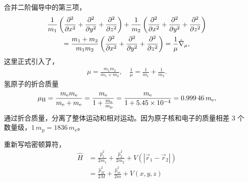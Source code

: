 合并二阶偏导中的第三项，
\begin{multline}
    \frac1{m_1} \left(\pdv[2]x + \pdv[2]y + \pdv[2]z\right) +
    \frac1{m_2} \left(\pdv[2]x + \pdv[2]y + \pdv[2]z\right) \\
    = \frac{m_1 + m_2}{m_1 m_2} \left(
        \pdv[2]x + \pdv[2]y + \pdv[2]z
    \right) = \frac{1}{\mu} \hat \nabla_\mu,
\end{multline}
这里正式引入了，
\begin{align}
    \mu = \frac{m_1m_2}{m_1 + m_2}, \quad \frac1{\mu}=\frac1{m_1} + \frac1{m_2}. 
\end{align}
氢原子的折合质量
\begin{align}
    \mu_{\mathrm H} = \frac{m_{\mathrm e} m_{\mathrm e}}{m_{\mathrm e}+m_{\mathrm e}} = \frac {m_{\mathrm e}} {1 + \frac{m_{\mathrm e}}{m_{\mathrm p}}} = \frac{m_{\mathrm e}}{1 + \num{5.45E-4}} = \num{0.99946} \,m_{\mathrm e}, 
\end{align}
通过折合质量，分离了整体运动和相对运动。因为原子核和电子的质量相差 3 个数量级，$1 \,m_{\mathrm p} = 1836 \,m_{\mathrm e}$。

重新写哈密顿算符，
\begin{align}
    \hat H &= \frac{\hat p_1^2}{2m_1} + \frac{\hat p_2^2}{2m_2} + V (|\vec r_1 - \vec r_2 |) \\
    &= \frac{\hat p_M^2}{2M} + \frac{\hat p_m^2}{2m} + V(x,y,z)
    \label{eq:hydro_cent_h}
\end{align}


